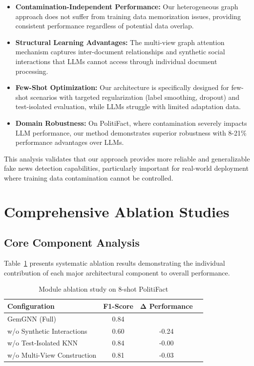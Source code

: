 \begin{itemize}
    \item \textbf{Contamination-Independent Performance:} Our heterogeneous graph approach does not suffer from training data memorization issues, providing consistent performance regardless of potential data overlap.
    
    \item \textbf{Structural Learning Advantages:} The multi-view graph attention mechanism captures inter-document relationships and synthetic social interactions that LLMs cannot access through individual document processing.
    
    \item \textbf{Few-Shot Optimization:} Our architecture is specifically designed for few-shot scenarios with targeted regularization (label smoothing, dropout) and test-isolated evaluation, while LLMs struggle with limited adaptation data.
    
    \item \textbf{Domain Robustness:} On PolitiFact, where contamination severely impacts LLM performance, our method demonstrates superior robustness with 8-21\% performance advantages over LLMs.
\end{itemize}

This analysis validates that our approach provides more reliable and generalizable fake news detection capabilities, particularly important for real-world deployment where training data contamination cannot be controlled.

\section{Comprehensive Ablation Studies}

\subsection{Core Component Analysis}

Table~\ref{tab:ablation_components} presents systematic ablation results demonstrating the individual contribution of each major architectural component to overall performance.

\begin{table}[htbp]
\centering
\caption{Module ablation study on 8-shot PolitiFact}
\label{tab:ablation_components}
\begin{tabular}{lccc}
\toprule
\textbf{Configuration} & \textbf{F1-Score} & \textbf{Δ Performance} \\
\midrule
GemGNN (Full) & 0.84 &  \\
\midrule
w/o Synthetic Interactions & 0.60 & -0.24 \\
w/o Test-Isolated KNN & 0.84 & -0.00 \\
w/o Multi-View Construction & 0.81 & -0.03 \\
\midrule
\bottomrule
\end{tabular}
\end{table}

